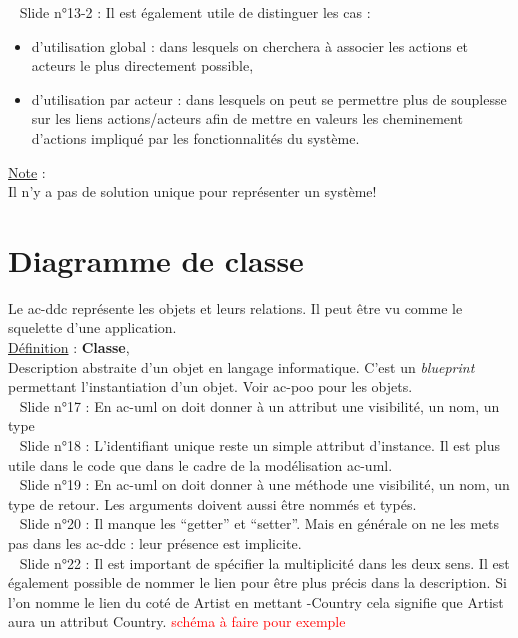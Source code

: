 \documentclass[a4paper,12pt,twoside]{article}
\newcommand{\note}[1]{\noindent\underline{Note} : \\ \indent #1}
\newcommand{\defi}[2]{\noindent\underline{Définition} : \textbf{#1},\\ \indent #2}
\newcommand{\slide}[2]{\textbullet ~ Slide n°#1 : \indent #2}
\begin{document}
\slide{13-2}{Il est également utile de distinguer les cas :}
\begin{itemize}
\item d'utilisation global : dans lesquels on cherchera à associer les actions et acteurs le plus directement possible,
\item d'utilisation par acteur : dans lesquels on peut se permettre plus de souplesse sur les liens actions/acteurs afin de mettre en valeurs les cheminement d'actions impliqué par les fonctionnalités du système.\end{itemize} $~$\\
\note{Il n'y a pas de solution unique pour représenter un système!}

\section{Diagramme de classe}

Le \gls{ac-ddc} représente les objets et leurs relations. Il peut être vu 
comme le squelette d'une application. \\

\defi{Classe}{Description abstraite d'un objet en langage informatique. C'est un \textit{blueprint} permettant l'instantiation d'un objet. Voir \gls{ac-poo} pour les objets.}\\


\slide{17}{En \gls{ac-uml} on doit donner à un attribut une visibilité, un nom, un type}\\

\slide{18}{L'identifiant unique reste un simple attribut d'instance. Il est plus utile dans le code que dans le cadre de la modélisation \gls{ac-uml}.} \\

\slide{19}{En \gls{ac-uml} on doit donner à une méthode une visibilité, un nom, un type de retour. Les arguments doivent aussi être nommés et typés.}\\

\slide{20}{Il manque les ``getter'' et ``setter''. Mais en générale on ne les mets pas dans les \gls{ac-ddc} : leur présence est implicite.} \\

\slide{22}{Il est important de spécifier la multiplicité dans les deux sens. Il est également possible de nommer le lien pour être plus précis dans la description. Si l'on nomme le lien du coté de Artist en mettant -Country cela signifie que Artist aura un attribut Country.} \textcolor{red}{schéma à faire pour exemple} \\
\end{document}
